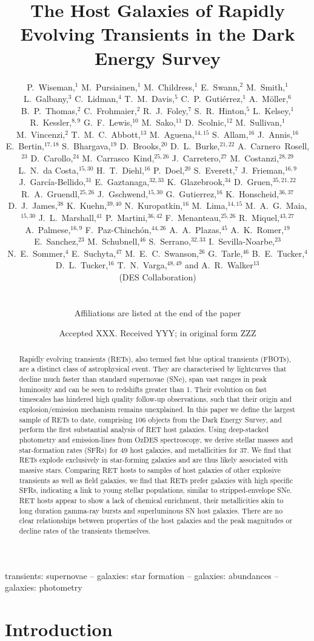 \documentclass[fleqn,usenatbib,]{mnras}
\title[RET host galaxies in DES]{The Host Galaxies of Rapidly Evolving Transients in the Dark Energy Survey}
\author[DES Collaboration]{
\parbox{\textwidth}{
\Large
P.~Wiseman,$^{1}$
M.~Pursiainen,$^{1}$
M.~Childress,$^{1}$
E.~Swann,$^{2}$
M.~Smith,$^{1}$
L.~Galbany,$^{3}$
C.~Lidman,$^{4}$
T.~M.~Davis,$^{5}$
C.~P.~Guti\'errez,$^{1}$
A.~M\"oller,$^{6}$
B.~P.~Thomas,$^{2}$
C.~Frohmaier,$^{2}$
R.~J.~Foley,$^{7}$
S.~R.~Hinton,$^{5}$
L.~Kelsey,$^{1}$
R.~Kessler,$^{8,9}$
G.~F.~Lewis,$^{10}$
M.~Sako,$^{11}$
D.~Scolnic,$^{12}$
M.~Sullivan,$^{1}$
M.~Vincenzi,$^{2}$
T.~M.~C.~Abbott,$^{13}$
M.~Aguena,$^{14,15}$
S.~Allam,$^{16}$
J.~Annis,$^{16}$
E.~Bertin,$^{17,18}$
S.~Bhargava,$^{19}$
D.~Brooks,$^{20}$
D.~L.~Burke,$^{21,22}$
A.~Carnero~Rosell,$^{23}$
D.~Carollo,$^{24}$
M.~Carrasco~Kind,$^{25,26}$
J.~Carretero,$^{27}$
M.~Costanzi,$^{28,29}$
L.~N.~da Costa,$^{15,30}$
H.~T.~Diehl,$^{16}$
P.~Doel,$^{20}$
S.~Everett,$^{7}$
J.~Frieman,$^{16,9}$
J.~Garc\'ia-Bellido,$^{31}$
E.~Gaztanaga,$^{32,33}$
K.~Glazebrook,$^{34}$
D.~Gruen,$^{35,21,22}$
R.~A.~Gruendl,$^{25,26}$
J.~Gschwend,$^{15,30}$
G.~Gutierrez,$^{16}$
K.~Honscheid,$^{36,37}$
D.~J.~James,$^{38}$
K.~Kuehn,$^{39,40}$
N.~Kuropatkin,$^{16}$
M.~Lima,$^{14,15}$
M.~A.~G.~Maia,$^{15,30}$
J.~L.~Marshall,$^{41}$
P.~Martini,$^{36,42}$
F.~Menanteau,$^{25,26}$
R.~Miquel,$^{43,27}$
A.~Palmese,$^{16,9}$
F.~Paz-Chinch\'{o}n,$^{44,26}$
A.~A.~Plazas,$^{45}$
A.~K.~Romer,$^{19}$
E.~Sanchez,$^{23}$
M.~Schubnell,$^{46}$
S.~Serrano,$^{32,33}$
I.~Sevilla-Noarbe,$^{23}$
N.~E.~Sommer,$^{4}$
E.~Suchyta,$^{47}$
M.~E.~C.~Swanson,$^{26}$
G.~Tarle,$^{46}$
B.~E.~Tucker,$^{4}$
D.~L.~Tucker,$^{16}$
T.~N.~Varga,$^{48,49}$
and A.~R.~Walker$^{13}$
\begin{center} (DES Collaboration) \end{center}
}
\vspace{0.4cm}
\\
\parbox{\textwidth}{Affiliations are listed at the end of the paper}
}
\date{Accepted XXX. Received YYY; in original form ZZZ}
\begin{document}
\label{firstpage}
\pagerange{\pageref{firstpage}--\pageref{lastpage}}
\maketitle

\begin{abstract}
Rapidly evolving transients (RETs), also termed fast blue optical transients (FBOTs), are a distinct class of astrophysical event. They are characterised by lightcurves that decline much faster than standard supernovae (SNe), span vast ranges in peak luminosity and can be seen to redshifts greater than 1. Their evolution on fast timescales has hindered high quality follow-up observations, such that their origin and explosion/emission mechanism remains unexplained. In this paper we define the largest sample of RETs to date, comprising 106 objects from the Dark Energy Survey, and perform the first substantial analysis of RET host galaxies. Using deep-stacked photometry and emission-lines from OzDES spectroscopy, we derive stellar masses and star-formation rates (SFRs) for 49 host galaxies, and metallicities for 37. We find that RETs explode exclusively in star-forming galaxies and are thus likely associated with massive stars. Comparing RET hosts to samples of host galaxies of other explosive transients as well as field galaxies, we find that RETs prefer galaxies with high specific SFRs, indicating a link to young stellar populations, similar to stripped-envelope SNe. RET hosts appear to show a lack of chemical enrichment, their metallicities akin to long duration gamma-ray bursts and superluminous SN host galaxies. There are no clear relationships between properties of the host galaxies and the peak magnitudes or decline rates of the transients themselves.

\end{abstract}

\begin{keywords}
transients: supernovae -- galaxies: star formation -- galaxies: abundances -- galaxies: photometry 
\end{keywords}



\section{Introduction}
\end{document}
